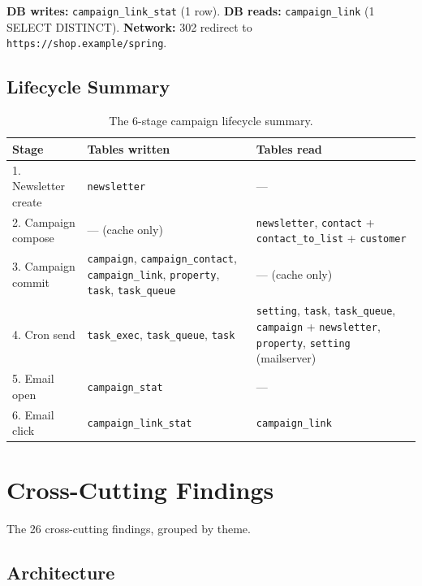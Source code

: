 \documentclass[11pt,a4paper]{article}
\begin{document}
\textbf{DB writes:} \texttt{campaign\_link\_stat} (1 row).
\textbf{DB reads:} \texttt{campaign\_link} (1 SELECT DISTINCT).
\textbf{Network:} 302 redirect to
\texttt{https://shop.example/spring}.

\subsection{Lifecycle Summary}

\begin{table}[htbp]
\centering
\caption{The 6-stage campaign lifecycle summary.}\label{tab:lifecycle-summary}
\footnotesize\sloppy
\begin{tabularx}{\columnwidth}{lXX}
\toprule
\textbf{Stage} & \textbf{Tables written} & \textbf{Tables read} \\
\midrule
1. Newsletter create & \texttt{newsletter} & --- \\
2. Campaign compose & --- (cache only) & \texttt{newsletter}, \texttt{contact} + \texttt{contact\_to\_list} + \texttt{customer} \\
3. Campaign commit & \texttt{campaign}, \texttt{campaign\_contact}, \texttt{campaign\_link}, \texttt{property}, \texttt{task}, \texttt{task\_queue} & --- (cache only) \\
4. Cron send & \texttt{task\_exec}, \texttt{task\_queue}, \texttt{task} & \texttt{setting}, \texttt{task}, \texttt{task\_queue}, \texttt{campaign} + \texttt{newsletter}, \texttt{property}, \texttt{setting} (mailserver) \\
5. Email open & \texttt{campaign\_stat} & --- \\
6. Email click & \texttt{campaign\_link\_stat} & \texttt{campaign\_link} \\
\bottomrule
\end{tabularx}
\end{table}

\section{Cross-Cutting Findings}\label{sec:findings}

The 26 cross-cutting findings, grouped by theme.

\subsection{Architecture}
\end{document}
